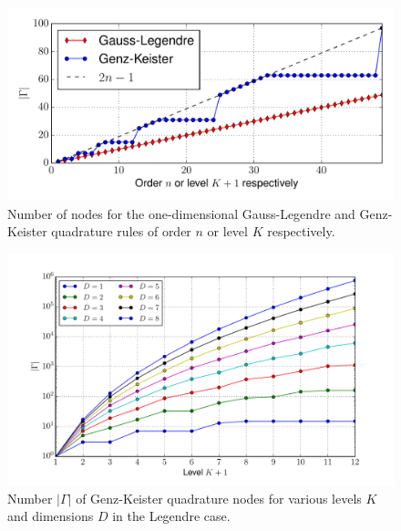 \documentclass[a4paper,10pt]{article}
\begin{document}
\begin{figure}
  \centering
  \includegraphics[width=\linewidth]{./img/number_nodes_legendre.pdf}
  \caption{Number of nodes for the one-dimensional Gauss-Legendre and Genz-Keister quadrature
  rules of order $n$ or level $K$ respectively.}
  \label{fig:number_nodes_legendre}
\end{figure}

\begin{figure}
  \centering
  \includegraphics[width=\linewidth]{./img/number_nodes_levdim_legendre.pdf}
  \caption{Number $|\Gamma|$ of Genz-Keister quadrature nodes for various
  levels $K$ and dimensions $D$ in the Legendre case.}
  \label{fig:number_nodes_levdim_legendre}
\end{figure}
\end{document}
